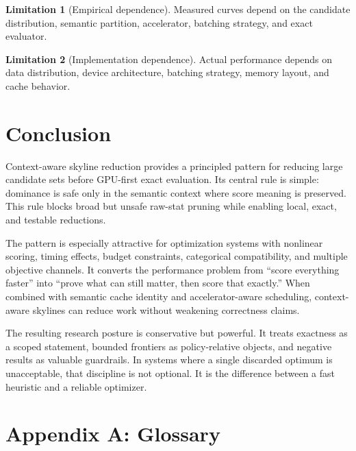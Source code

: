 \documentclass[11pt,oneside]{article}
\theoremstyle{definition}
\newtheorem{limitation}{Limitation}[section]
\begin{document}
\begin{limitation}[Empirical dependence]
Measured curves depend on the candidate distribution, semantic partition, accelerator, batching strategy, and exact evaluator.
\end{limitation}

\begin{limitation}[Implementation dependence]
Actual performance depends on data distribution, device architecture, batching strategy, memory layout, and cache behavior.
\end{limitation}

\section{Conclusion}

Context-aware skyline reduction provides a principled pattern for reducing large candidate sets before GPU-first exact evaluation. Its central rule is simple: dominance is safe only in the semantic context where score meaning is preserved. This rule blocks broad but unsafe raw-stat pruning while enabling local, exact, and testable reductions.

The pattern is especially attractive for optimization systems with nonlinear scoring, timing effects, budget constraints, categorical compatibility, and multiple objective channels. It converts the performance problem from ``score everything faster'' into ``prove what can still matter, then score that exactly.'' When combined with semantic cache identity and accelerator-aware scheduling, context-aware skylines can reduce work without weakening correctness claims.

The resulting research posture is conservative but powerful. It treats exactness as a scoped statement, bounded frontiers as policy-relative objects, and negative results as valuable guardrails. In systems where a single discarded optimum is unacceptable, that discipline is not optional. It is the difference between a fast heuristic and a reliable optimizer.

\section*{Appendix A: Glossary}
\end{document}
